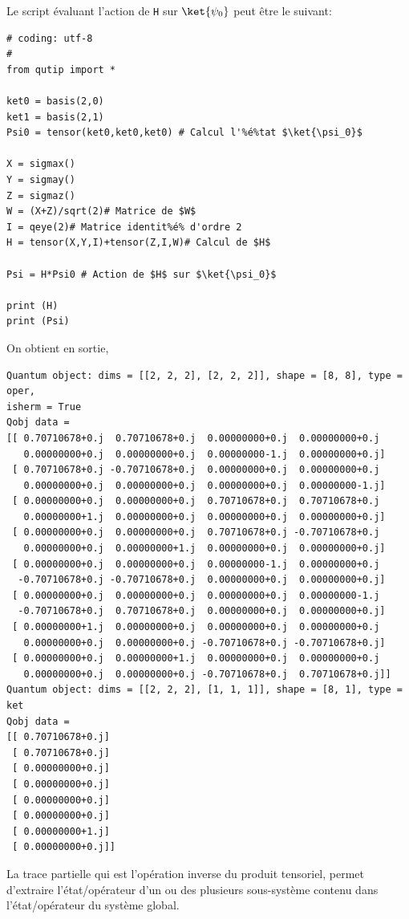 \begin{solution}
Le script évaluant l'action de \texttt{H} sur $\ket{\psi_0}$ peut être le 
suivant:
\end{solution}

\begin{lstlisting}[commentstyle=\scriptsize]
# coding: utf-8 
#
from qutip import *

ket0 = basis(2,0)
ket1 = basis(2,1)
Psi0 = tensor(ket0,ket0,ket0) # Calcul l'%é%tat $\ket{\psi_0}$

X = sigmax()
Y = sigmay()
Z = sigmaz()
W = (X+Z)/sqrt(2)# Matrice de $W$
I = qeye(2)# Matrice identit%é% d'ordre 2
H = tensor(X,Y,I)+tensor(Z,I,W)# Calcul de $H$

Psi = H*Psi0 # Action de $H$ sur $\ket{\psi_0}$

print (H)
print (Psi)
\end{lstlisting}
On obtient en sortie,
\begin{lstlisting}
Quantum object: dims = [[2, 2, 2], [2, 2, 2]], shape = [8, 8], type = oper, 
isherm = True
Qobj data =
[[ 0.70710678+0.j  0.70710678+0.j  0.00000000+0.j  0.00000000+0.j
   0.00000000+0.j  0.00000000+0.j  0.00000000-1.j  0.00000000+0.j]
 [ 0.70710678+0.j -0.70710678+0.j  0.00000000+0.j  0.00000000+0.j
   0.00000000+0.j  0.00000000+0.j  0.00000000+0.j  0.00000000-1.j]
 [ 0.00000000+0.j  0.00000000+0.j  0.70710678+0.j  0.70710678+0.j
   0.00000000+1.j  0.00000000+0.j  0.00000000+0.j  0.00000000+0.j]
 [ 0.00000000+0.j  0.00000000+0.j  0.70710678+0.j -0.70710678+0.j
   0.00000000+0.j  0.00000000+1.j  0.00000000+0.j  0.00000000+0.j]
 [ 0.00000000+0.j  0.00000000+0.j  0.00000000-1.j  0.00000000+0.j
  -0.70710678+0.j -0.70710678+0.j  0.00000000+0.j  0.00000000+0.j]
 [ 0.00000000+0.j  0.00000000+0.j  0.00000000+0.j  0.00000000-1.j
  -0.70710678+0.j  0.70710678+0.j  0.00000000+0.j  0.00000000+0.j]
 [ 0.00000000+1.j  0.00000000+0.j  0.00000000+0.j  0.00000000+0.j
   0.00000000+0.j  0.00000000+0.j -0.70710678+0.j -0.70710678+0.j]
 [ 0.00000000+0.j  0.00000000+1.j  0.00000000+0.j  0.00000000+0.j
   0.00000000+0.j  0.00000000+0.j -0.70710678+0.j  0.70710678+0.j]]
Quantum object: dims = [[2, 2, 2], [1, 1, 1]], shape = [8, 1], type = ket
Qobj data =
[[ 0.70710678+0.j]
 [ 0.70710678+0.j]
 [ 0.00000000+0.j]
 [ 0.00000000+0.j]
 [ 0.00000000+0.j]
 [ 0.00000000+0.j]
 [ 0.00000000+1.j]
 [ 0.00000000+0.j]]
\end{lstlisting}

La trace partielle qui est l'opération inverse du produit tensoriel, permet 
d'extraire l'état/opérateur d'un ou des plusieurs sous-système contenu dans 
l'état/opérateur du système global.

